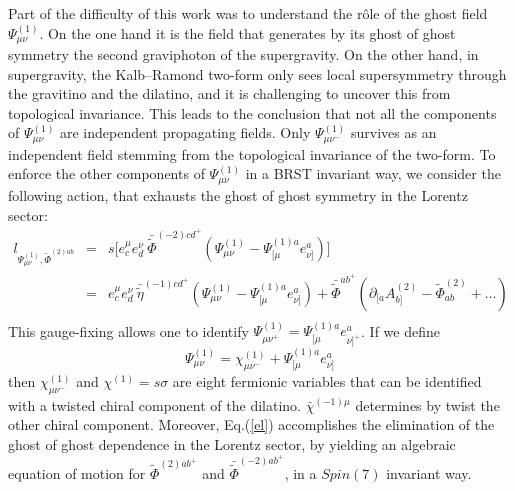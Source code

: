 \documentclass[a4paper,12pt]{article}
\def\L{l}
\let\nn=\nonumber
\begin{document}
Part of the difficulty of this work was to 
understand the r\^ole of the ghost  field
$\Psi_{\mu\nu}^{(1)}$. On the one hand it is the field that generates by
its ghost of ghost symmetry the second graviphoton of the supergravity.
On the other hand,   in supergravity, the Kalb--Ramond two-form only
sees local supersymmetry through the gravitino and the dilatino, and it is
challenging to uncover this from  topological invariance. This leads to the
conclusion that not all the components of 
$\Psi_{\mu\nu}^{(1)}$ are independent propagating fields.  Only
$\Psi_{\mu\nu^-}^{(1)}$ survives as an independent field stemming
from the topological invariance of the two-form. 
To enforce the other components of $\Psi_{\mu\nu}^{(1)}$ in a BRST invariant 
way, we consider  the following
action, that exhausts the ghost of ghost symmetry in the Lorentz sector: 
\begin{eqnarray}\label{el}
\L_{\Psi^{(1)}_{\mu\nu},\tilde{\Phi}^{(2)ab}}&=&s\Big[ 
e^\mu_c e^\nu_d \  \bar{\tilde\Phi}^{(-2)cd^+}( {
\Psi}^{(1)}_{\mu\nu} -\Psi^{(1)a}_{[\mu}e^a_{\nu]})\Big]
\nn \\
&=&
e^\mu_c e^\nu_d \ 
\bar {\tilde \eta}^{(-1)cd^+}( { \Psi}_{\mu\nu}^{(1) }
-\Psi^{(1)a}_{[\mu} e^a_{\nu]})
+
\bar {\tilde \Phi}^{ab^+}( \partial _{[a}A^{(2)}_{ b]}
-\tilde \Phi  ^{( 2) }_{ab}+\ldots)\nonumber\\
\end{eqnarray}
This gauge-fixing allows one to identify $\Psi_{\mu\nu^+}^{(1)}=
\Psi^{(1)a}_{[\mu} e^a_{\nu]^+} $. If we define
\begin{equation}
\label{psib}
\Psi_{\mu\nu}^{(1)}=    \chi_{\mu\nu^-}^{(1)}
+\Psi^{(1)a}_{[\mu} e^a_{\nu]} 
\end{equation}
then $\chi_{\mu\nu^-}^{(1)}$ and $\chi^{(1)}=s\sigma$ are eight
fermionic variables that can be identified with a twisted
chiral component of the
dilatino. $\bar\chi^{(-1)\mu}$   determines by twist the other
chiral component. 
Moreover, Eq.(\ref{el}) 
accomplishes the  elimination of the ghost of ghost dependence in the Lorentz
sector, by yielding an algebraic equation of motion for 
$  {\tilde \Phi}^{( 2)ab^+}$ and $  \bar {\tilde \Phi}^{(-2)ab^+}$, in
a  $Spin(7)$ invariant way. 
\end{document}
